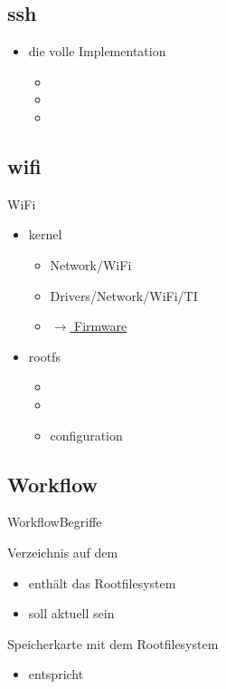 \subsection{ssh}
\begin{frame}{}
 \begin{itemize}
  \item {} die volle Implementation 
  \begin{itemize}
   \item {}
   \item {}
   \item {}
  \end{itemize}
 \end{itemize}
\end{frame}

\subsection{wifi}
\begin{frame}{WiFi}
 \begin{itemize}
  \item kernel
  \begin{itemize}
   \item Network/WiFi
   \item Drivers/Network/WiFi/TI 
   \item \href{https://drive.switch.ch/index.php/s/aKuLspjS8CRz3qN}{$\to$ Firmware}
  \end{itemize}
  \item rootfs
  \begin{itemize}
   \item {}
   \item {}
   \item configuration
  \end{itemize}
 \end{itemize}
\end{frame}

\subsection{Workflow}
\begin{frame}{Workflow}{Begriffe}
\begin{description}
 \item[target-root] Verzeichnis auf dem \host
 \begin{itemize}
  \item enthält das \target Rootfilesystem
  \item soll aktuell sein
 \end{itemize}
 \item[SD-Card] Speicherkarte mit dem \target Rootfilesystem
 \begin{itemize}
  \item entspricht  
 \end{itemize}
\end{description}
\end{frame}

